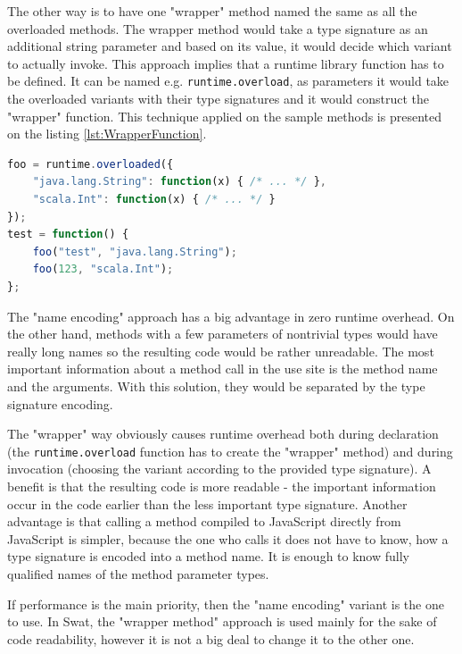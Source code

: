 \documentclass[12pt,a4paper]{report}
\begin{document}
The other way is to have one "wrapper" method named the same as all the overloaded methods. The wrapper method would take a type signature as an additional string parameter and based on its value, it would decide which variant to actually invoke. This approach implies that a runtime library function has to be defined. It can be named e.g. \texttt{runtime.overload}, as parameters it would take the overloaded variants with their type signatures and it would construct the "wrapper" function. This technique applied on the sample methods is presented on the listing \ref{lst:WrapperFunction}.

\begin{minipage}{\linewidth}
\begin{lstlisting}[language=JavaScript,caption={Overloading in JavaScript.},label={lst:WrapperFunction}]
foo = runtime.overloaded({
	"java.lang.String": function(x) { /* ... */ },
	"scala.Int": function(x) { /* ... */ }
});
test = function() {
	foo("test", "java.lang.String");
	foo(123, "scala.Int");
};
\end{lstlisting}
\end{minipage}

The "name encoding" approach has a big advantage in zero runtime overhead. On the other hand, methods with a few parameters of nontrivial types would have really long names so the resulting code would be rather unreadable. The most important information about a method call in the use site is the method name and the arguments. With this solution, they would be separated by the type signature encoding.

The "wrapper" way obviously causes runtime overhead both during declaration (the \texttt{runtime.overload} function has to create the "wrapper" method) and during invocation (choosing the variant according to the provided type signature). A benefit is that the resulting code is more readable - the important information occur in the code earlier than the less important type signature. Another advantage is that calling a method compiled to JavaScript directly from JavaScript is simpler, because the one who calls it does not have to know, how a type signature is encoded into a method name. It is enough to know fully qualified names of the method parameter types.

If performance is the main priority, then the "name encoding" variant is the one to use. In Swat, the "wrapper method" approach is used mainly for the sake of code readability, however it is not a big deal to change it to the other one.
\end{document}
